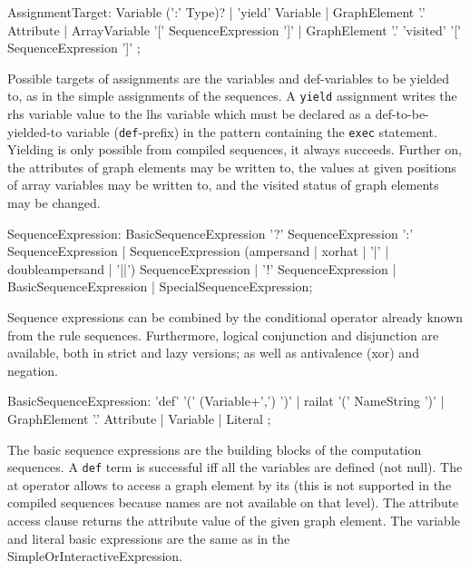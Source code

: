 \begin{rail}
  AssignmentTarget: 
    Variable (':' Type)? |
    'yield' Variable |
    GraphElement '.' Attribute |
    ArrayVariable '[' SequenceExpression ']' |
    GraphElement '.' 'visited' '[' SequenceExpression ']'
;
\end{rail}

Possible targets of assignments are the variables and def-variables to be yielded to, as in the simple assignments of the sequences. 
A \texttt{yield} assignment writes the rhs variable value to the lhs variable which must be declared as a  def-to-be-yielded-to variable (\texttt{def}-prefix) in the pattern containing the \texttt{exec} statement.
Yielding is only possible from compiled sequences, it always succeeds.
Further on, the attributes of graph elements may be written to, the values at given positions of array variables may be written to, and the visited status of graph elements may be changed.

\begin{rail}
  SequenceExpression: 
    BasicSequenceExpression '?' SequenceExpression ':' SequenceExpression |
    SequenceExpression (ampersand | xorhat | '|' | doubleampersand | '||') SequenceExpression |
    '!' SequenceExpression |
    BasicSequenceExpression |
    SpecialSequenceExpression;
\end{rail}

Sequence expressions can be combined by the conditional operator already known from the rule sequences.
Furthermore, logical conjunction and disjunction are available, both in strict and lazy versions;
as well as antivalence (xor) and negation.

\begin{rail}
  BasicSequenceExpression:
    'def' '(' (Variable+',') ')' |
	  railat '(' NameString ')' |
 	  GraphElement '.' Attribute |
	  Variable | 
    Literal
  ;
\end{rail}

The basic sequence expressions are the building blocks of the computation sequences.
A \texttt{def} term is successful iff all the variables are defined (not null).
The at operator allows to access a graph element by its  (this is not supported in the compiled sequences because names are not available on that level).
The attribute access clause returns the attribute value of the given graph element.
The variable and literal basic expressions are the same as in the SimpleOrInteractiveExpression.

